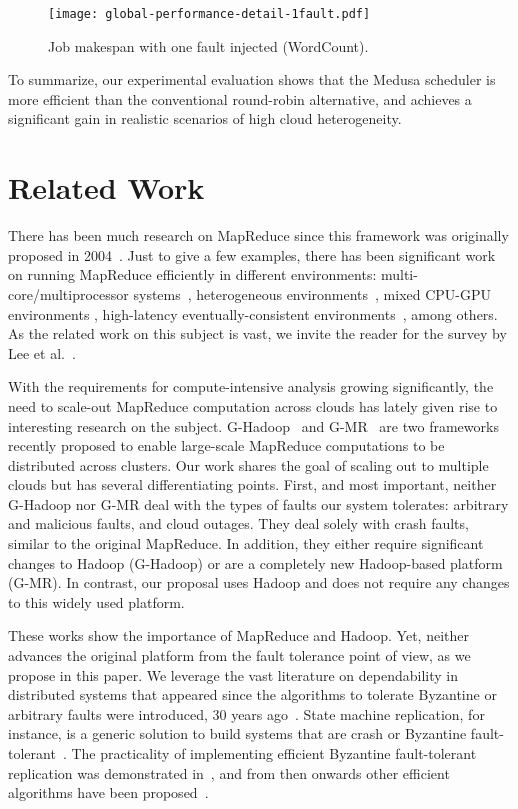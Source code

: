 \documentclass[10pt, conference, compsocconf]{IEEEtran}
\begin{document}
\begin{figure}
  \centering
  \texttt{[image: global-performance-detail-1fault.pdf]}
  \caption{Job makespan with one fault injected (WordCount).}
  \label{eval:fig:performance:fault}
\end{figure}

To summarize, our experimental evaluation shows that the Medusa scheduler is more efficient than the conventional round-robin alternative, and achieves a significant gain in realistic scenarios of high cloud heterogeneity.

\section{Related Work}
\label{sec:relatedwork}

There has been much research on MapReduce since this framework was originally proposed in 2004~\cite{Dean:04}.
Just to give a few examples, there has been significant work on running MapReduce efficiently in different environments: multi-core/multiprocessor systems~\cite{Ranger:07}, heterogeneous environments~\cite{Zaharia:08}, mixed CPU-GPU environments \cite{conf-ipps-JiangA12}, high-latency eventually-consistent environments~\cite{Gunarathne:10}, among others.
As the related work on this subject is vast, we invite the reader for the survey by Lee et al.~\cite{Lee2012}.

With the requirements for compute-intensive analysis growing significantly, the need to scale-out MapReduce computation across clouds has lately given rise to interesting research on the subject.
G-Hadoop~\cite{Wang2013739} and G-MR~\cite{JayalathSE14} are two frameworks recently proposed to enable large-scale MapReduce computations to be distributed across clusters.
Our work shares the goal of scaling out to multiple clouds but has several differentiating points.
First, and most important, neither G-Hadoop nor G-MR deal with the types of faults our system tolerates: arbitrary and malicious faults, and cloud outages.
They deal solely with crash faults, similar to the original MapReduce.
In addition, they either require significant changes to Hadoop (G-Hadoop) or are a completely new Hadoop-based platform (G-MR).
In contrast, our proposal uses Hadoop and does not require any changes to this widely used platform.

These works show the importance of MapReduce and Hadoop.
Yet, neither advances the original platform from the fault tolerance point of view, as we propose in this paper.
We leverage the vast literature on dependability in distributed systems that appeared since the algorithms to tolerate Byzantine or arbitrary faults were introduced, 30 years ago~\cite{Lam82}.
State machine replication, for instance, is a generic solution to build systems that are crash or Byzantine fault-tolerant~\cite{Sch90}.
The practicality of implementing efficient Byzantine fault-tolerant replication was demonstrated in~\cite{Cas02}, and from then onwards other efficient algorithms have been proposed~\cite{Cle09b,Veronese:13,Ami06}.
\end{document}
